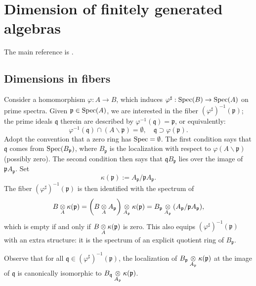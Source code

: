 
\chapter{Dimension of finitely generated algebras}

The main reference is \cite[\S 13]{Mat80}.

\section{Dimensions in fibers}
Consider a homomorphism $\varphi: A \to B$, which induces $\varphi^\sharp: \operatorname{Spec}(B) \to \operatorname{Spec}(A)$ on prime spectra. Given $\mathfrak{p} \in \operatorname{Spec}(A)$, we are interested in the fiber $(\varphi^\sharp)^{-1}(\mathfrak{p})$; the prime ideals $\mathfrak{q}$ therein are described by $\varphi^{-1}(\mathfrak{q}) = \mathfrak{p}$, or equivalently:
\[ \varphi^{-1}(\mathfrak{q}) \cap (A \smallsetminus \mathfrak{p}) = \emptyset, \quad \mathfrak{q} \supset \varphi(\mathfrak{p}). \]
Adopt the convention that a zero ring has $\operatorname{Spec} = \emptyset$. The first condition says that $\mathfrak{q}$ comes from $\operatorname{Spec}(B_{\mathfrak{p}})$, where $B_{\mathfrak{p}}$ is the localization with respect to $\varphi(A \smallsetminus \mathfrak{p})$ (possibly zero). The second condition then says that $\mathfrak{q}B_{\mathfrak{p}}$ lies over the image of $\mathfrak{p}A_{\mathfrak{p}}$. Set
\[ \kappa(\mathfrak{p}) := A_{\mathfrak{p}}/\mathfrak{p}A_{\mathfrak{p}}. \]
The fiber $(\varphi^\sharp)^{-1}(\mathfrak{p})$ is then identified with the spectrum of
\[ B \underset{A}{\otimes} \kappa(\mathfrak{p}) = \left( B \underset{A}{\otimes} A_{\mathfrak{p}} \right) \underset{A_{\mathfrak{p}}}{\otimes} \kappa(\mathfrak{p}) = B_{\mathfrak{p}} \underset{A_{\mathfrak{p}}}{\otimes} (A_{\mathfrak{p}}/\mathfrak{p}A_{\mathfrak{p}} ), \]
which is empty if and only if $B \underset{A}{\otimes} \kappa(\mathfrak{p})$ is zero. This also equips $(\varphi^\sharp)^{-1}(\mathfrak{p})$ with an extra structure: it is the spectrum of an explicit quotient ring of $B_{\mathfrak{p}}$.

Observe that for all $\mathfrak{q} \in (\varphi^\sharp)^{-1}(\mathfrak{p})$, the localization of $B_{\mathfrak{p}} \underset{A_{\mathfrak{p}}}{\otimes} \kappa(\mathfrak{p})$ at the image of $\mathfrak{q}$ is canonically isomorphic to $B_{\mathfrak{q}} \underset{A_{\mathfrak{p}}}{\otimes} \kappa(\mathfrak{p})$.

